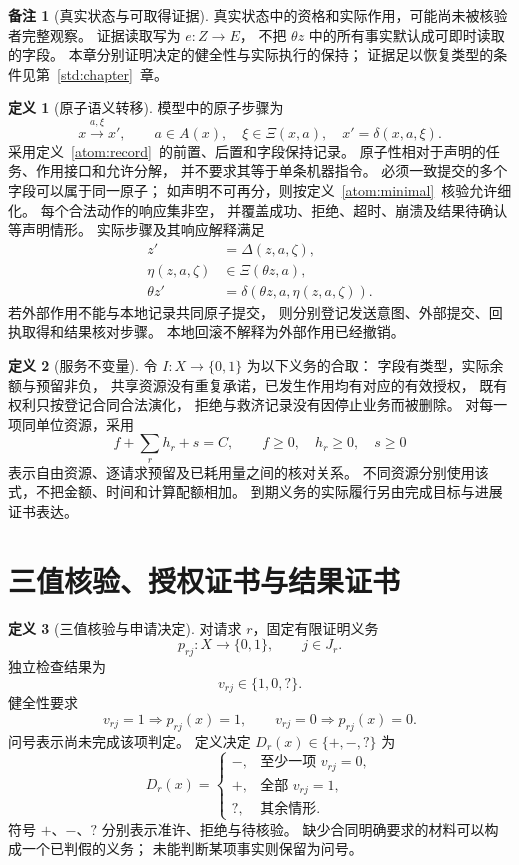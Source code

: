 \documentclass[UTF8,12pt,a4paper,openany,fontset=none,zihao=false]{ctexrep}
\theoremstyle{definition}
\newtheorem{definition}{定义}[chapter]
\newtheorem{remark}{备注}[chapter]
\newcommand{\1}{\mathbf 1}
\begin{document}
\begin{remark}[真实状态与可取得证据]
真实状态中的资格和实际作用，可能尚未被核验者完整观察。
证据读取写为 \(e:Z\to E\)，
不把 \(\theta z\) 中的所有事实默认成可即时读取的字段。
本章分别证明决定的健全性与实际执行的保持；
证据足以恢复类型的条件见第~\ref{std:chapter}~章。
\end{remark}

\begin{definition}[原子语义转移]
\label{svc:atom}
模型中的原子步骤为
\[
x\xrightarrow{a,\xi}x',
\qquad
a\in A(x),\quad
\xi\in\Xi(x,a),\quad
x'=\delta(x,a,\xi).
\]
采用定义~\ref{atom:record}~的前置、后置和字段保持记录。
原子性相对于声明的任务、作用接口和允许分解，
并不要求其等于单条机器指令。
必须一致提交的多个字段可以属于同一原子；
如声明不可再分，则按定义~\ref{atom:minimal}~核验允许细化。
每个合法动作的响应集非空，
并覆盖成功、拒绝、超时、崩溃及结果待确认等声明情形。
实际步骤及其响应解释满足
\[
\begin{aligned}
z'&=\Delta(z,a,\zeta),\\
\eta(z,a,\zeta)&\in\Xi(\theta z,a),\\
\theta z'&=\delta(\theta z,a,\eta(z,a,\zeta)).
\end{aligned}
\]
若外部作用不能与本地记录共同原子提交，
则分别登记发送意图、外部提交、回执取得和结果核对步骤。
本地回滚不解释为外部作用已经撤销。
\end{definition}

\begin{definition}[服务不变量]
\label{svc:invariant}
令 \(I:X\to\{0,1\}\) 为以下义务的合取：
字段有类型，实际余额与预留非负，
共享资源没有重复承诺，已发生作用均有对应的有效授权，
既有权利只按登记合同合法演化，
拒绝与救济记录没有因停止业务而被删除。
对每一项同单位资源，采用
\[
f+\sum_{r}h_r+s=C,\qquad
f\ge0,\quad h_r\ge0,\quad s\ge0
\]
表示自由资源、逐请求预留及已耗用量之间的核对关系。
不同资源分别使用该式，不把金额、时间和计算配额相加。
到期义务的实际履行另由完成目标与进展证书表达。
\end{definition}

\section{三值核验、授权证书与结果证书}

\begin{definition}[三值核验与申请决定]
\label{svc:three-values}
对请求 \(r\)，固定有限证明义务
\[
p_{rj}:X\longrightarrow\{0,1\},
\qquad j\in J_r.
\]
独立检查结果为
\[
v_{rj}\in\{1,0,?\}.
\]
健全性要求
\[
v_{rj}=1\Longrightarrow p_{rj}(x)=1,
\qquad
v_{rj}=0\Longrightarrow p_{rj}(x)=0.
\]
问号表示尚未完成该项判定。
定义决定 \(D_r(x)\in\{+,-,?\}\) 为
\[
D_r(x)=
\begin{cases}
- ,&\text{至少一项 }v_{rj}=0,\\
+ ,&\text{全部 }v_{rj}=1,\\
? ,&\text{其余情形}.
\end{cases}
\]
符号 \(+\)、\(-\)、\( ? \) 分别表示准许、拒绝与待核验。
缺少合同明确要求的材料可以构成一个已判假的义务；
未能判断某项事实则保留为问号。
\end{definition}
\end{document}
